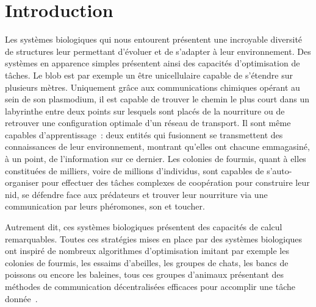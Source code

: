 \chapter*{Introduction}

Les systèmes biologiques qui nous entourent présentent une incroyable diversité de structures leur permettant d'évoluer et de s'adapter à leur environnement.
Des systèmes en apparence simples présentent ainsi des capacités d'optimisation de tâches. Le blob est par exemple un être unicellulaire capable de s'étendre sur plusieurs mètres. Uniquement grâce aux communications chimiques opérant au sein de son plasmodium, il est capable de trouver le chemin le plus court dans un labyrinthe entre deux points sur lesquels sont placés de la nourriture \cite{Nakagaki2000IntelligenceMB} ou de retrouver une configuration optimale d'un réseau de transport. Il sont même capables d'apprentissage~: deux entités qui fusionnent se transmettent des connaissances de leur environnement, montrant qu'elles ont chacune emmagasiné, à un point, de l'information sur ce dernier.
Les colonies de fourmis, quant à elles constituées de milliers, voire de millions d'individus, sont capables de s'auto-organiser pour effectuer des tâches complexes de coopération pour construire leur nid, se défendre face aux prédateurs et trouver leur nourriture via une communication par leurs phéromones, son et toucher.

Autrement dit, ces systèmes biologiques présentent des capacités de calcul remarquables. 
Toutes ces stratégies mises en place par des systèmes biologiques ont inspiré de nombreux algorithmes d'optimisation imitant par exemple les colonies de fourmis, les essaims d'abeilles, les groupes de chats, les bancs de poissons ou encore les baleines, tous ces groupes d'animaux présentant des méthodes de communication décentralisées efficaces pour accomplir une tâche donnée~\cite{Darwish2018BioinspiredCA}.

